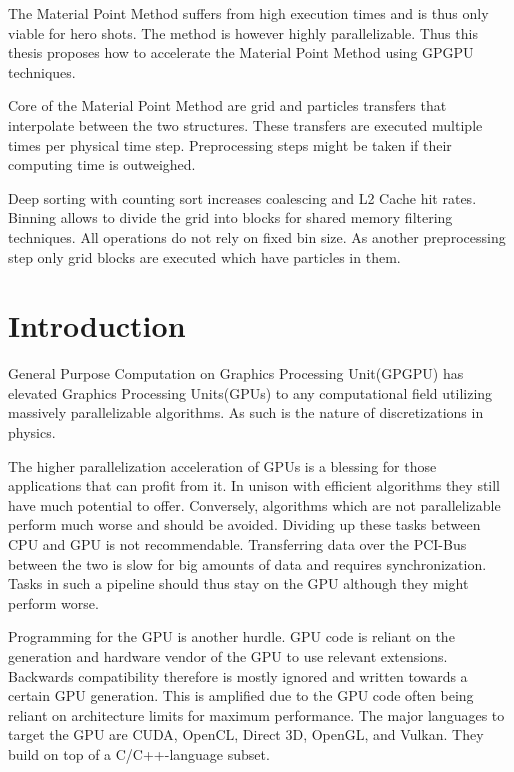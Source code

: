 \documentclass[m,times]{cgMA}
\begin{document}
\noindent The Material Point Method suffers from high execution times and is thus only viable for hero shots. The method is however highly parallelizable. Thus this thesis proposes how to accelerate the Material Point Method using GPGPU techniques.

\noindent Core of the Material Point Method are grid and particles transfers that interpolate between the two structures. These transfers are executed multiple times per physical time step. Preprocessing steps might be taken if their computing time is outweighed.

\noindent Deep sorting with counting sort increases coalescing and L2 Cache hit rates. Binning allows to divide the grid into blocks for shared memory filtering techniques. All operations do not rely on fixed bin size. As another preprocessing step only grid blocks are executed which have particles in them.
\vfill
\clearpage
\tableofcontents

\clearpage         %
{}

\section{Introduction} \label{intro}
General Purpose Computation on Graphics Processing Unit(GPGPU) has elevated Graphics Processing Units(GPUs) to any computational field utilizing massively parallelizable algorithms. As such is the nature of discretizations in physics.

The higher parallelization acceleration of GPUs is a blessing for those applications that can profit from it. In unison with efficient algorithms they still have much potential to offer. Conversely, algorithms which are not parallelizable perform much worse and should be avoided. Dividing up these tasks between CPU and GPU is not recommendable. Transferring data over the PCI-Bus between the two is slow for big amounts of data and requires synchronization. Tasks in such a pipeline should thus stay on the GPU although they might perform worse.

Programming for the GPU is another hurdle. GPU code is reliant on the generation and hardware vendor of the GPU to use relevant extensions. Backwards compatibility therefore is mostly ignored and written towards a certain GPU generation. This is amplified due to the GPU code often being reliant on architecture limits for maximum performance. The major languages to target the GPU are CUDA, OpenCL, Direct 3D, OpenGL, and Vulkan. They build on top of a C/C++-language subset.
\end{document}
